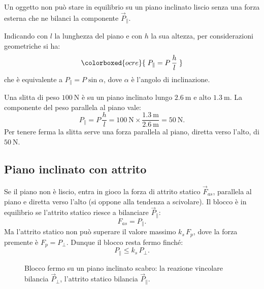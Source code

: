 \begin{remark}
Un oggetto non può stare in equilibrio su un piano inclinato liscio senza una forza esterna che ne bilanci la componente $\vec{P}_\parallel$.
\end{remark}

Indicando con $l$ la lunghezza del piano e con $h$ la sua altezza, per considerazioni geometriche si ha:
\[
\colorboxed{ocre}{\; P_\parallel = P\,\frac{h}{l} \;}
\]
che è equivalente a $P_\parallel = P\sin\alpha$, dove $\alpha$ è l'angolo di inclinazione.

\begin{testexample}
Una slitta di peso $\SI{100}{\newton}$ è su un piano inclinato lungo $\SI{2,6}{\meter}$ e alto $\SI{1,3}{\meter}$. La componente del peso parallela al piano vale:
\[
P_\parallel = P\,\frac{h}{l} = \SI{100}{\newton}\times\frac{\SI{1,3}{\meter}}{\SI{2,6}{\meter}} = \SI{50}{\newton}.
\]
Per tenere ferma la slitta serve una forza parallela al piano, diretta verso l'alto, di $\SI{50}{\newton}$.
\end{testexample}

\subsection{Piano inclinato con attrito}
Se il piano non è liscio, entra in gioco la forza di attrito statico $\vec{F}_{as}$, parallela al piano e diretta verso l'alto (si oppone alla tendenza a scivolare). Il blocco è in equilibrio se l'attrito statico riesce a bilanciare $\vec{P}_\parallel$:
\[
F_{as} = P_\parallel .
\]
Ma l'attrito statico non può superare il valore massimo $k_s\,F_p$, dove la forza premente è $F_p = P_\perp$. Dunque il blocco resta fermo finché:
\[
P_\parallel \le k_s\,P_\perp .
\]

\begin{figure}[h!]
\centering
{}
\caption{Blocco fermo su un piano inclinato scabro: la reazione vincolare bilancia $\vec{P}_\perp$, l'attrito statico bilancia $\vec{P}_\parallel$.}
\label{fig:incl-attrito}
\end{figure}

